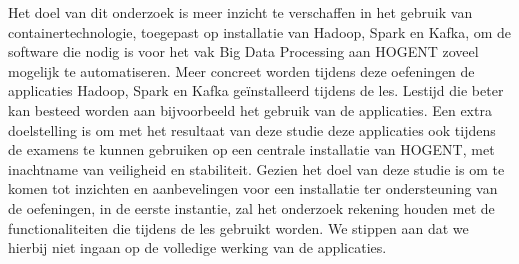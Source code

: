 Het doel van dit onderzoek is meer inzicht te verschaffen in het gebruik van containertechnologie, toegepast op installatie van Hadoop, Spark en Kafka, om de software die nodig is voor het vak Big Data Processing aan HOGENT zoveel mogelijk te automatiseren.
\newline
Meer concreet worden tijdens deze oefeningen de applicaties Hadoop, Spark en Kafka geïnstalleerd tijdens de les. Lestijd die beter kan besteed worden aan bijvoorbeeld het gebruik van de applicaties.
\newline
\newline
Een extra doelstelling is om met het resultaat van deze studie deze applicaties ook tijdens de examens te kunnen gebruiken op een centrale installatie van HOGENT, met inachtname van veiligheid en stabiliteit.
\newline
\newline
Gezien het doel van deze studie is om te komen tot inzichten en aanbevelingen voor een installatie ter ondersteuning van de oefeningen, in de eerste instantie, zal het onderzoek rekening houden met de functionaliteiten die tijdens de les gebruikt worden. We stippen aan dat we hierbij niet ingaan op de volledige werking van de applicaties.
\newline
\newline

